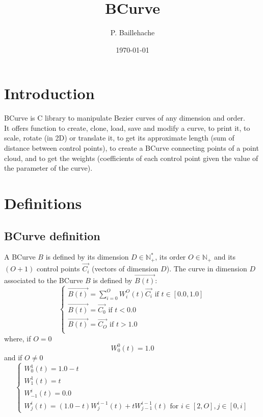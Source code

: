 \documentclass[12pt, a4paper]{article}
\begin{document}
\title{BCurve}
\author{P. Baillehache}
\date{\today}
\maketitle

\tableofcontents

\section*{Introduction}

BCurve is C library to manipulate Bezier curves of any dimension and order.\\ 

It offers function to create, clone, load, save and modify a curve, to print it, to scale, rotate (in 2D) or translate it, to get its approximate length (sum of distance between control points), to create a BCurve connecting points of a point cloud, and to get the weights (coefficients of each control point given the value of the parameter of the curve).\\ 

\section{Definitions}

\subsection{BCurve definition}

A BCurve $B$ is defined by its dimension $D\in\mathbb{N^*_+}$, its order $O\in\mathbb{N_+}$ and its $(O+1)$ control points $\overrightarrow{C_i}$ (vectors of dimension $D$). The curve in dimension $D$ associated to the BCurve $B$ is defined by $\overrightarrow{B(t)}$:\\
\begin{equation}
\left\lbrace
\begin{array}{l}
\overrightarrow{B(t)}=\sum_{i=0}^OW^O_i(t)\overrightarrow{C_i}\textrm{ if }t\in[0.0,1.0]\\
\overrightarrow{B(t)}=\overrightarrow{C_0}\textrm{ if }t<0.0\\
\overrightarrow{B(t)}=\overrightarrow{C_{O}}\textrm{ if }t>1.0\\
\end{array}
\right.
\end{equation}
where, if $O=0$\\
\begin{equation}
W^0_0(t)=1.0
\end{equation}
and if $O\neq 0$\\
\begin{equation}
\left\lbrace
\begin{array}{l}
W^1_0(t)=1.0-t\\
W^1_1(t)=t\\
W^i_{-1}(t)=0.0\\
W^i_j(t)=(1.0-t)W^{i-1}_j(t)+tW^{i-1}_{j-1}(t)\textrm{ for }i\in[2,O],j\in[0,i]
\end{array}
\right.
\end{equation}
\end{document}
